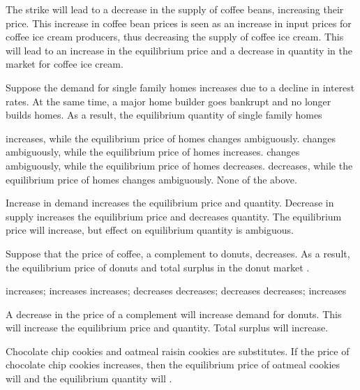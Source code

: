 \documentclass[addpoints,11pt]{exam}
\theoremstyle{definition}
\newcommand{\blank}[0]{\underline{\hspace{3cm}}}
\begin{document}
\begin{questions}
	\begin{solution}
		The strike will lead to a decrease in the supply of coffee beans, increasing their price. This increase in coffee bean prices is seen as an increase in input prices for coffee ice cream producers, thus decreasing the supply of coffee ice cream. This will lead to an increase in the equilibrium price and a decrease in quantity in the market for coffee ice cream.
	\end{solution}
	
\newpage
			
		\question Suppose the demand for single family homes increases due to a decline in interest rates. At the same time, a major home builder goes bankrupt and no longer builds homes. As a result, the equilibrium quantity of single family homes
		
		\begin{choices}
			\choice increases, while the equilibrium price of homes changes ambiguously.
			\CorrectChoice changes ambiguously, while the equilibrium price of homes increases.
			\choice changes ambiguously, while the equilibrium price of homes decreases.
			\choice decreases, while the equilibrium price of homes changes ambiguously.
			\choice None of the above.
		\end{choices}
		
	\begin{solution}
		Increase in demand increases the equilibrium price and quantity. Decrease in supply increases the equilibrium price and decreases quantity. The equilibrium price will increase, but effect on equilibrium quantity is ambiguous.
	\end{solution}
	
	\question Suppose that the price of coffee, a complement to donuts, decreases. As a result, the equilibrium price of donuts \blank and total surplus in the donut market \blank.
	
	\begin{choices}
		\CorrectChoice increases; increases
		\choice increases; decreases
		\choice decreases; decreases
		\choice decreases; increases
	\end{choices}
	
	\begin{solution}
		A decrease in the price of a complement will increase demand for donuts. This will increase the equilibrium price and quantity. Total surplus will increase.
	\end{solution}

	\question Chocolate chip cookies and oatmeal raisin cookies are substitutes. If the price of chocolate chip cookies increases, then the equilibrium price of oatmeal cookies will \blank and the equilibrium quantity will \blank.
	

\end{questions}
\end{document}
